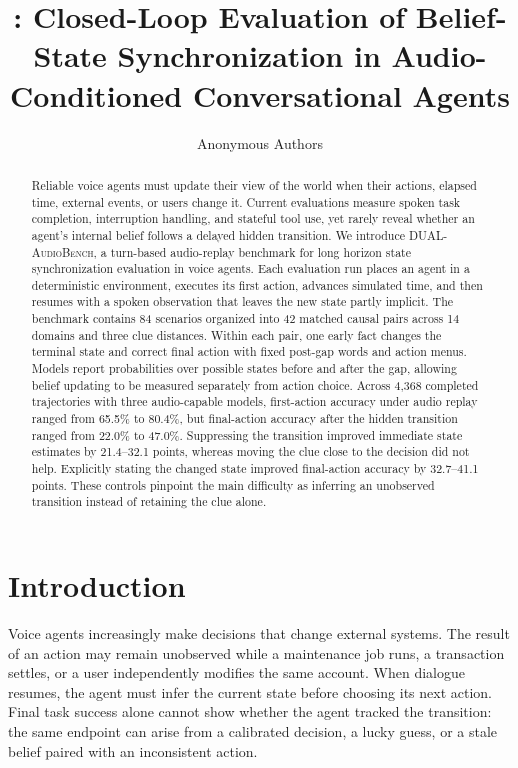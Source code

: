 \documentclass{article}
\title{\benchmark: Closed-Loop Evaluation of Belief-State Synchronization in Audio-Conditioned Conversational Agents}
\author{Anonymous Authors}
\newcommand{\benchmark}{\textsc{DUAL-AudioBench}}
\newcommand{\numscenarios}{84}
\newcommand{\numpairs}{42}
\newcommand{\numdomains}{14}
\begin{document}
\maketitle

\begin{abstract}
Reliable voice agents must update their view of the world when their actions, elapsed time, external events, or users change it. Current evaluations measure spoken task completion, interruption handling, and stateful tool use, yet rarely reveal whether an agent's internal belief follows a delayed hidden transition. We introduce \benchmark, a turn-based audio-replay benchmark for long horizon state synchronization evaluation in voice agents. Each evaluation run places an agent in a deterministic environment, executes its first action, advances simulated time, and then  resumes with a spoken observation that leaves the new state partly implicit. The benchmark contains \numscenarios{} scenarios organized into \numpairs{} matched causal pairs across \numdomains{} domains and three clue distances. Within each pair, one early fact changes the terminal state and correct final action with fixed post-gap words and action menus. Models report probabilities over possible states before and after the gap, allowing belief updating to be measured separately from action choice. Across 4,368 completed trajectories with three audio-capable models, first-action accuracy under audio replay ranged from 65.5\% to 80.4\%, but final-action accuracy after the hidden transition ranged from 22.0\% to 47.0\%. Suppressing the transition improved immediate state estimates by 21.4--32.1 points, whereas moving the clue close to the decision did not help. Explicitly stating the changed state improved final-action accuracy by 32.7--41.1 points. These controls pinpoint the main difficulty as inferring an unobserved transition instead of retaining the clue alone.
\end{abstract}

\section{Introduction}

Voice agents increasingly make decisions that change external systems. The result of an action may remain unobserved while a maintenance job runs, a transaction settles, or a user independently modifies the same account. When dialogue resumes, the agent must infer the current state before choosing its next action. Final task success alone cannot show whether the agent tracked the transition: the same endpoint can arise from a calibrated decision, a lucky guess, or a stale belief paired with an inconsistent action.
\end{document}

